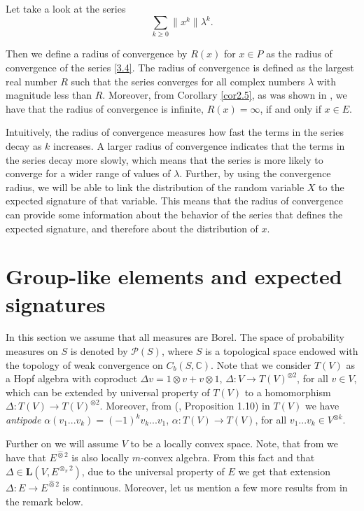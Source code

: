 \documentclass[12pt,a4paper]{report}
\theoremstyle{definition}
\begin{document}
Let take a look at the series 	
\begin{equation}\label{3.4}
	\sum_{k\geq0}\lVert x^k\rVert \lambda^k.
\end{equation}

Then we define a radius of convergence by $R(x)$ for $x\in P$ as the radius of convergence of the series \ref{3.4}. The radius of convergence is defined as the largest real number $R$ such that the series converges for all complex numbers $\lambda$ with magnitude less than $R$. Moreover, from  Corollary \ref{cor2.5}, as was shown in \parencite{chevyrev2016characteristic}, we have that the radius of convergence is infinite, $R(x) = \infty$, if and only if $x \in E$.

Intuitively, the radius of convergence measures how fast the terms in the series decay as $k$ increases. A larger radius of convergence indicates that the terms in the series decay more slowly, which means that the series is more likely to converge for a wider range of values of $\lambda$. 
Further, by using the convergence radius, we will be able to link the distribution of the random variable $X$ to the expected signature of that variable. This means that the radius of convergence can provide some information about the behavior of the series that defines the expected signature, and therefore about the distribution of $x$.




\section{Group-like elements and expected signatures}


In this section we assume that all measures are Borel. The space of probability measures on $S$ is denoted by $\mathcal{P}(S)$, where $S$ is a topological space endowed with the topology of weak convergence on $C_b(S,\mathbb{C})$. Note that we consider $T (V )$ as a Hopf algebra with coproduct $\Delta v = 1 \otimes v + v \otimes 1$, $\Delta : V \rightarrow T(V )^{\otimes 2}$, for all $v\in V$, which can be extended by universal property of $T(V)$ to a homomorphism $\Delta : T(V) \rightarrow T(V )^{\otimes 2}$. Moreover, from (\parencite{reutenauer1993free}, Proposition 1.10) in $T(V )$ we have \textit{antipode} $\alpha(v_1... v_k) = (-1)^k v_k... v_1$, $\alpha : T(V) \rightarrow T(V)$, for all $v_1 ... v_k \in V^{\otimes k}$. 

Further on we will assume $V$ to be a locally convex space. Note, that from \parencite[][p.378]{mallios1986topological} we have that $E^{\hat{\otimes}2}$ is also locally $m$-convex algebra. From this fact and that $\Delta \in \textbf{L}(V, E^{\otimes_\pi2})$, due to the universal property of $E$ we get that extension $\Delta : E \rightarrow E^{\hat{\otimes}2}$ is continuous. Moreover, let us mention a few more results from \parencite{chevyrev2016characteristic} in the remark below.
\end{document}
